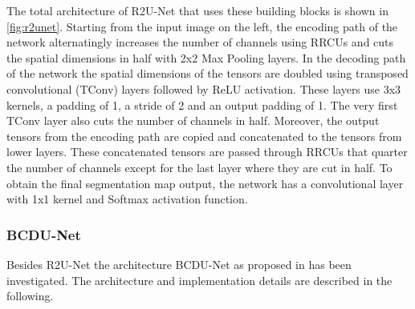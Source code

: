 \documentclass{article}
\begin{document}
The total architecture of R2U-Net that uses these building blocks is shown in 
\autoref{fig:r2unet}. Starting from the input image on the left, the encoding 
path of the network alternatingly increases the number of channels using RRCUs 
and cuts the spatial dimensions in half with 2x2 Max Pooling layers. In the 
decoding path of the network the spatial dimensions of the tensors are doubled 
using transposed convolutional (TConv) layers followed by ReLU activation. 
These layers use 3x3 kernels, a padding of 1, a stride of 2 and an output 
padding of 1. The 
very first TConv layer also cuts the number of channels in half.
Moreover, the output tensors from the encoding path are copied and concatenated 
to the tensors from lower layers. These concatenated tensors are passed through 
RRCUs that quarter the number of channels except for the last layer where they 
are cut in half. To obtain the final segmentation map output, the network has a 
convolutional layer with 1x1 kernel and Softmax activation function.
\autocite[3-5]{R2UNet}

\subsubsection{BCDU-Net}

Besides R2U-Net the architecture BCDU-Net as proposed in \autocite{BCDUNet} has 
been investigated. The architecture and implementation details are described in 
the following.
\end{document}
